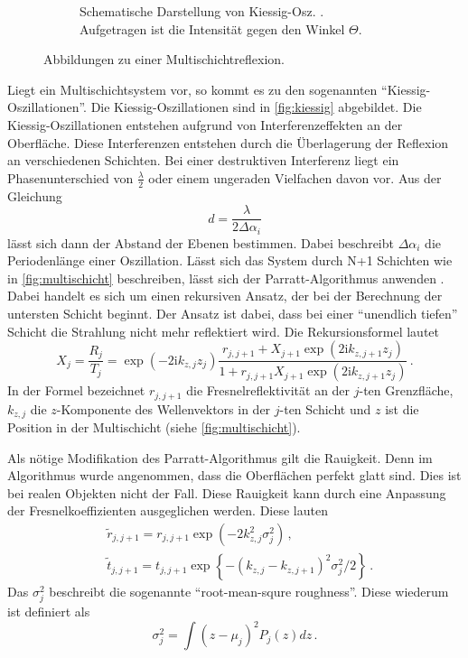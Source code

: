 \begin{figure}
\begin{subfigure}{0.58\textwidth}
        \caption{Schematische Darstellung von Kiessig-Osz. . \cite{kiessig}
        Aufgetragen ist die Intensität gegen den Winkel $\Theta$.}
        \label{fig:kiessig}
    \end{subfigure}
    \caption{Abbildungen zu einer Multischichtreflexion.
    \label{fig:subkiessig}}
\end{figure}


Liegt ein Multischichtsystem vor, so kommt es zu den sogenannten \enquote{Kiessig-Oszillationen}.
Die Kiessig-Oszillationen sind in \autoref{fig:kiessig} abgebildet.
Die Kiessig-Oszillationen entstehen aufgrund von Interferenzeffekten an der Oberfläche.
Diese Interferenzen entstehen durch die Überlagerung der Reflexion an verschiedenen Schichten.
Bei einer destruktiven Interferenz liegt ein Phasenunterschied von $\frac{\lambda}{2}$ oder einem ungeraden Vielfachen davon vor.
Aus der Gleichung
\begin{equation} \label{eq:schichtdicke}
    d = \frac{\lambda}{2 \Delta \alpha_i}
\end{equation}
lässt sich dann der Abstand der Ebenen bestimmen.
Dabei beschreibt $\Delta \alpha_i$ die Periodenlänge einer Oszillation. 
Lässt sich das System durch N+1 Schichten wie in \autoref{fig:multischicht} beschreiben, lässt sich der Parratt-Algorithmus anwenden \cite{tolan_xray}.
Dabei handelt es sich um einen rekursiven Ansatz, der bei der Berechnung der untersten Schicht beginnt.
Der Ansatz ist dabei, dass bei einer \enquote{unendlich tiefen} Schicht die Strahlung nicht mehr reflektiert wird.
Die Rekursionsformel lautet
\begin{equation}
    X_j=\frac{R_j}{T_j}=\exp \left(-2 \mathrm{i} k_{z, j} z_j\right) \frac{r_{j, j+1}+X_{j+1} \exp \left(2 \mathrm{i} k_{z, j+1} z_j\right)}{1+r_{j, j+1} X_{j+1} \exp \left(2 \mathrm{i} k_{z, j+1} z_j\right)} \, .
\end{equation}
In der Formel bezeichnet $r_{j,j+1}$ die Fresnelreflektivität an der $j$-ten Grenzfläche, $k_{z, j}$ die $z$-Komponente des Wellenvektors in der $j$-ten Schicht
und $z$ ist die Position in der Multischicht (siehe \autoref{fig:multischicht}).

Als nötige Modifikation des Parratt-Algorithmus gilt die Rauigkeit.
Denn im Algorithmus wurde angenommen, dass die Oberflächen perfekt glatt sind.
Dies ist bei realen Objekten nicht der Fall.
Diese Rauigkeit kann durch eine Anpassung der Fresnelkoeffizienten ausgeglichen werden.
Diese lauten
\begin{align}
    & \tilde{r}_{j, j+1}=r_{j, j+1} \exp \left(-2 k_{z, j}^2 \sigma_j^2\right) \, ,\\
    & \tilde{t}_{j, j+1}=t_{j, j+1} \exp \left\{-\left(k_{z, j}-k_{z, j+1}\right)^2 \sigma_j^2 / 2\right\} \, .
\end{align}
Das $\sigma_j^2$ beschreibt die sogenannte \enquote{root-mean-squre roughness}.
Diese wiederum ist definiert als
\begin{equation*}
    \sigma_j^2 = \int (z - \mu_j)^2 P_j (z) dz \, .
\end{equation*}

